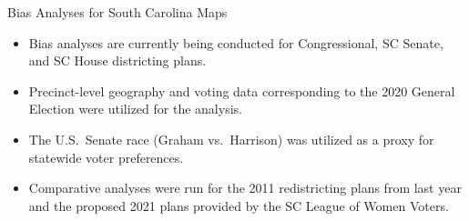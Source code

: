\documentclass[xcolor=dvipsnames,table]{beamer}
\theoremstyle{plain}
\theoremstyle{definition}
\begin{document}

\begin{frame}{Bias Analyses for South Carolina Maps}
\begin{itemize}
	\item Bias analyses are currently being conducted for  Congressional, SC Senate, and SC House districting plans.
	\item Precinct-level geography and voting data corresponding to the 2020 General Election were utilized for the analysis.
	\item The U.S.\ Senate race (Graham vs.\ Harrison) was utilized as a proxy for statewide voter preferences.
	\item Comparative analyses were run for the 2011 redistricting plans from last year and the proposed 2021 plans provided by the SC League of Women Voters.
\end{itemize}
\end{frame}


\end{document}
